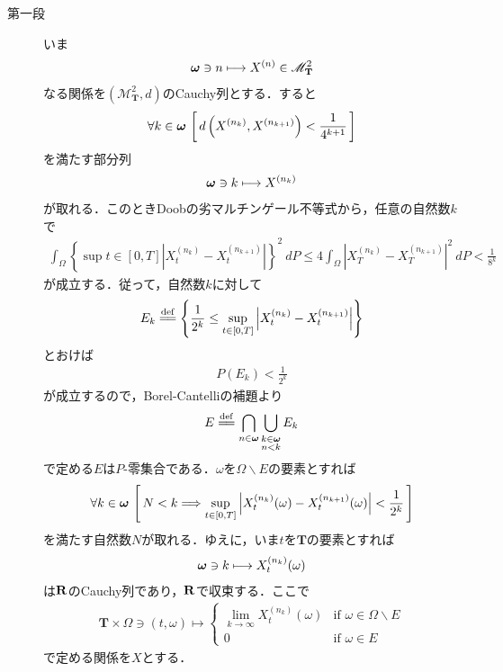 	\begin{sketch}\mbox{}
		\begin{description}
			\item[第一段] いま
				\begin{align}
					{\boldsymbol \omega} \ni n \longmapsto X^{(n)} \in \mathscr{M}^2_{\mathbf{T}}
				\end{align}
				なる関係を$\left(\mathscr{M}^2_{\mathbf{T}},d\right)$のCauchy列とする．すると
				\begin{align}
					\forall k \in {\boldsymbol \omega}\, \left[\, d\left( X^{(n_k)},X^{(n_{k+1})} \right) < \frac{1}{4^{k+1}}\, \right]
				\end{align}
				を満たす部分列
				\begin{align}
					{\boldsymbol \omega} \ni k \longmapsto X^{(n_k)}
				\end{align}
				が取れる．このときDoobの劣マルチンゲール不等式から，任意の自然数$k$で
				\begin{align}
					\int_\Omega \left\{ \sup{t \in [0,T]}{\left|X_t^{(n_k)} - X_t^{(n_{k+1})}\right|} \right\}^2\ dP
					\leq 4 \int_\Omega \left|X_T^{(n_k)} - X_T^{(n_{k+1})}\right|^2\ dP
					< \frac{1}{8^k}
					\label{fom:thm_pseudo_metric_on_square_integrable_martingales_2}
				\end{align}
				が成立する．従って，自然数$k$に対して
				\begin{align}
					E_k \defeq \left\{ \frac{1}{2^k} \leq \sup{t \in [0,T]}{\left|X_t^{(n_k)} - X_t^{(n_{k+1})}\right|} \right\}
				\end{align}
				とおけば
				\begin{align}
					P(E_k) < \frac{1}{2^k}
				\end{align}
				が成立するので，Borel-Cantelliの補題より
				\begin{align}
					E \defeq \bigcap_{n \in \Natural} \bigcup_{\substack{k \in \Natural \\ n < k}} E_k
				\end{align}
				で定める$E$は$P$-零集合である．$\omega$を$\Omega \backslash E$の要素とすれば
				\begin{align}
					\forall k \in {\boldsymbol \omega}\,
					\left[\, N < k \Longrightarrow \operatorname*{sup}_{t \in [0,T]} \left|X_t^{(n_k)}(\omega) - X_t^{(n_{k+1})}(\omega)\right| < \frac{1}{2^k}\, \right]
					\label{fom:thm_pseudo_metric_on_square_integrable_martingales_1}
				\end{align}
				を満たす自然数$N$が取れる．ゆえに，いま$t$を$\mathbf{T}$の要素とすれば
				\begin{align}
					{\boldsymbol \omega} \ni k \longmapsto X_t^{(n_k)}(\omega)
				\end{align}
				は$\mathbf{R}$のCauchy列であり，$\mathbf{R}$で収束する．ここで
				\begin{align}
					\mathbf{T} \times \Omega \ni (t,\omega) \longmapsto
					\begin{cases}
						\lim_{k \to \infty} X_t^{(n_k)}(\omega) & \mbox{if } \omega \in \Omega \backslash E \\
						0 & \mbox{if } \omega \in E
					\end{cases} 
				\end{align}
				で定める関係を$X$とする．
			

\end{description}
\end{sketch}
